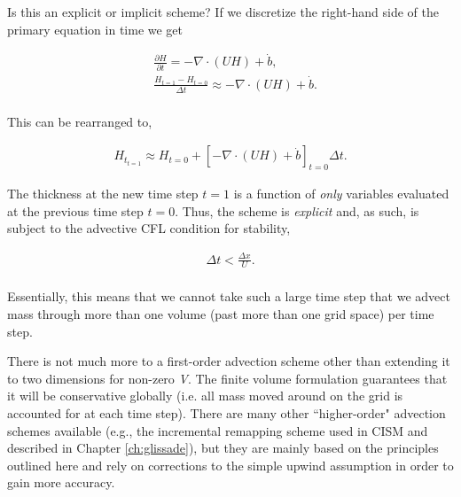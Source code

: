 Is this an explicit or implicit scheme? If we discretize the right-hand side of the primary equation in time we get

\begin{align*}
  & \frac{\partial H}{\partial t}=-\nabla \cdot \left( UH \right)+\dot{b}, \\
 & \frac{H_{t=1}-H_{t=0}}{\Delta t}\approx -\nabla \cdot \left( UH \right)+\dot{b}.\\
\end{align*}

This can be rearranged to,

\begin{align*}
H_{t_{t=1}}\approx H_{t=0}+\left[ -\nabla \cdot \left( UH \right)+\dot{b} \right]_{t=0}\Delta t.
\end{align*}

The thickness at the new time step $t=1$ is a function of \textit{only} variables evaluated at the previous time step $t=0$. Thus, the scheme is \textit{explicit} and, as such, is subject to the advective CFL condition for stability,

\begin{align*}
\Delta t<\frac{\Delta x}{U}.\\
\end{align*}

Essentially, this means that we cannot take such a large time step that we advect mass through more than one volume (past more than one grid space) per time step.

There is not much more to a first-order advection scheme other than extending it to two dimensions for non-zero \textit{V}. The finite volume formulation guarantees that it will be conservative globally (i.e. all mass moved around on the grid is accounted for at each time step). There are many other ``higher-order" advection schemes available (e.g., the incremental remapping scheme used in CISM and described in Chapter \ref{ch:glissade}), but they are mainly based on the principles outlined here and rely on corrections to the simple upwind assumption in order to gain more accuracy.
